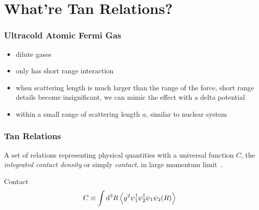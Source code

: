 \section{What're Tan Relations?}
\begin{frame}
	\frametitle{Ultracold Atomic Fermi Gas}

	\begin{itemize}
		\item dilute gases
		\item only has short range interaction
		\item when scattering length is much larger than the range of the force, short range details become insignificant, we can mimic the effect with a delta potential
		\item within a small range of scattering length $a$, similar to nuclear system
	\end{itemize}


\end{frame}
\begin{frame}
	\frametitle{Tan Relations}

	A set of relations representing physical quantities with a universal function $C$, the \emph{integrated contact density} or simply \emph{contact}, in large momentum limit~\parencite{Tan2008,Tan2008a,Tan_2008}.
	\begin{alertblock}{Contact}
		$$C\equiv\int\dd^3R\expval{g^2\psi^\dagger_1\psi^\dagger_2\psi_1\psi_2(R)}$$
	\end{alertblock}


\end{frame}

